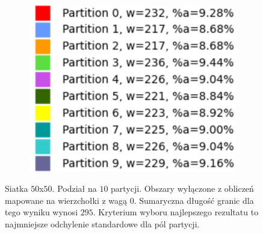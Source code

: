 \begin{figure}[h]
\begin{subfigure}{.33\textwidth}
    \centering
    \includegraphics[width=0.9\linewidth]{images/results/m_k/with/11/results}
    \caption[short]{}
\end{subfigure}
\caption{Siatka $50$x$50$. Podział na $10$ partycji.
Obszary wyłączone z obliczeń mapowane na wierzchołki z wagą $0$.
Sumaryczna długość granic dla tego wyniku wynosi $295$.
Kryterium wyboru najlepszego rezultatu to najmniejsze odchylenie standardowe dla pól partycji.}
\label{result:11}
\end{figure}
